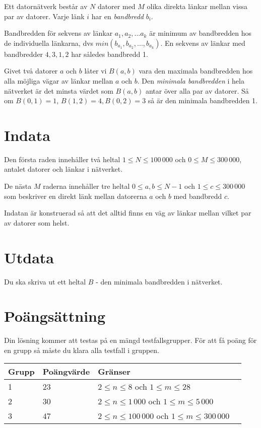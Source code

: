 Ett datornätverk består av $N$ datorer med $M$ olika direkta länkar mellan vissa par av datorer. Varje länk $i$ har en \emph{bandbredd} $b_i$.

Bandbredden för sekvens av länkar $a_1, a_2, ... a_k$ är minimum av bandbredden hos de individuella länkarna, dvs $min(b_{a_1}, b_{a_2}, ..., b_{a_k})$. En sekvens av länkar med bandbredder $4, 3, 1, 2$ har således bandbredd 1.

Givet två datorer $a$ och $b$ låter vi $B(a, b)$ vara den maximala bandbredden hos alla möjliga vägar av länkar mellan $a$ och $b$. Den \emph{minimala bandbredden} i hela nätverket är det minsta värdet som $B(a, b)$ antar över alla par av datorer. Så om $B(0, 1) = 1$, $B(1, 2) = 4, B(0, 2) = 3$ så är den minimala bandbredden 1.

\section*{Indata}
Den första raden innehåller två heltal $1 \le N \le 100\,000$ och $0 \le M \le 300\,000$, antalet datorer och länkar i nätverket. 

De nästa $M$ raderna innehåller tre heltal $0 \le a, b \le N - 1$ och $1 \le c \le 300\,000$ som beskriver en direkt länk mellan datorerna $a$ och $b$ med bandbredd $c$.

Indatan är konstruerad så att det alltid finns en väg av länkar mellan vilket par av datorer som helst.

\section*{Utdata}
Du ska skriva ut ett heltal $B$ - den minimala bandbredden i nätverket.

\section*{Poängsättning}
Din lösning kommer att testas på en mängd testfallsgrupper. För att få poäng
för en grupp så måste du klara alla testfall i gruppen.

\begin{tabular}{| l | l | l | l |}
    \hline
    Grupp & Poängvärde & Gränser    \\ \hline
    1     & 23         & $2 \le n \le 8$ och $1 \le m \le 28$ \\ \hline
    2     & 30         & $2 \le n \le 1\,000$ och $1 \le m \le 5\,000$ \\ \hline
    3     & 47         & $2 \le n \le 100\,000$ och $1 \le m \le 300\,000$ \\ \hline
\end{tabular}

